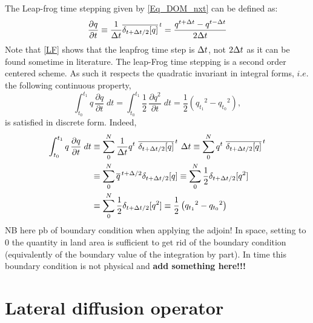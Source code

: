 \documentclass[NEMO_book]{subfiles}
\begin{document}
The Leap-frog time stepping given by \eqref{Eq_DOM_nxt} can be defined as:
\begin{equation} \label{LF}
   \frac{\partial q}{\partial t} 
   		\equiv \frac{1}{\Delta t} \overline{ \delta _{t+\Delta t/2}[q]}^{\,t} 
		=         \frac{q^{t+\Delta t}-q^{t-\Delta t}}{2\Delta t}
\end{equation} 
Note that \eqref{LF} shows that the leapfrog time step is $\Delta t$, not $2\Delta t$ 
as it can be found sometime in literature. 
The leap-Frog time stepping is a second order centered scheme. As such it respects 
the quadratic invariant in integral forms, $i.e.$ the following continuous property,
\begin{equation} \label{Energy}
\int_{t_0}^{t_1} {q\, \frac{\partial q}{\partial t} \;dt} 
	=\int_{t_0}^{t_1} {\frac{1}{2}\, \frac{\partial q^2}{\partial t} \;dt} 
	=  \frac{1}{2} \left( {q_{t_1}}^2 - {q_{t_0}}^2 \right) ,
\end{equation}
is satisfied in discrete form. Indeed, 
\begin{equation} \begin{split}
\int_{t_0}^{t_1} {q\, \frac{\partial q}{\partial t} \;dt} 
	&\equiv \sum\limits_{0}^{N} 
			{\frac{1}{\Delta t} q^t \ \overline{ \delta _{t+\Delta t/2}[q]}^{\,t} \ \Delta t} 
	   \equiv \sum\limits_{0}^{N}  { q^t \ \overline{ \delta _{t+\Delta t/2}[q]}^{\,t} } \\
	&\equiv \sum\limits_{0}^{N}  { \overline{q}^{\,t+\Delta/2}{ \delta _{t+\Delta t/2}[q]}}
	   \equiv \sum\limits_{0}^{N}  { \frac{1}{2} \delta _{t+\Delta t/2}[q^2] }\\
	&\equiv \sum\limits_{0}^{N}  { \frac{1}{2} \delta _{t+\Delta t/2}[q^2] }
	   \equiv \frac{1}{2} \left( {q_{t_1}}^2 - {q_{t_0}}^2 \right)
\end{split} \end{equation}
NB here pb of boundary condition when applying the adjoin! In space, setting to 0 
the quantity in land area is sufficient to get rid of the boundary condition 
(equivalently of the boundary value of the integration by part). In time this boundary 
condition is not physical and \textbf{add something here!!!}







\section{Lateral diffusion operator}
\end{document}
